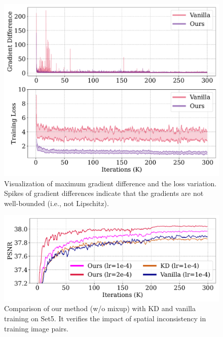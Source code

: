 \documentclass[letterpaper]{article} %
\begin{document}
\begin{figure}[t]
    \begin{center}
    \includegraphics[width=\columnwidth]{figures/optimization_landscape.pdf}
    \end{center}
    \caption{
    Visualization of maximum gradient difference and the loss variation. Spikes of gradient differences indicate that the gradients are not well-bounded (i.e., not Lipschitz).
    }
    \label{fig:optimization_landscape}
\end{figure}

\begin{figure}[t]
    \begin{center}
    \includegraphics[width=\columnwidth]{figures/different_training_schemes.pdf}
    \end{center}
    \caption{
    Comparison of our method (w/o mixup) with KD and vanilla training on Set5. It verifies the impact of spatial inconsistency in training image pairs.
    }
    \label{fig:different_training_schemes}
\end{figure}
%
\end{document}
